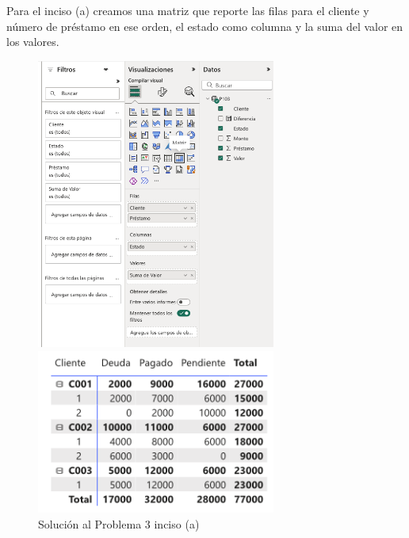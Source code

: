 \documentclass{article}
\begin{document}
Para el inciso (a) creamos una matriz que reporte las filas para el cliente y número de préstamo en ese orden, el estado como columna y la suma del valor en los valores.
\begin{figure}[!h]
    \centering
    \begin{minipage}{\textwidth}
        \centering
        \includegraphics[width=0.7\textwidth]{figures/s103a-1.png}
    \end{minipage}
    \hfill
    \begin{minipage}{\textwidth}
        \centering
        \includegraphics[width=0.7\textwidth]{figures/s103a-2.png}
    \end{minipage}
    \captionsetup{width=0.9\textwidth}
    \caption{Solución al Problema 3 inciso (a)}
    \label{fig:s103a}
\end{figure}
\end{document}
